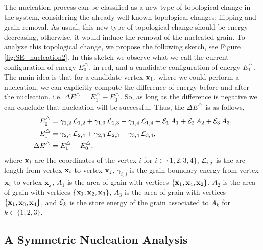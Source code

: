 The nucleation process can be classified as a new type of topological change in the system, considering the already well-known topological changes: flipping and  grain removal.
As usual, this new type of topological change should be energy decreasing, otherwise, it would 
induce the removal of the nucleated grain.
To analyze this topological change, we propose the following sketch, see Figure \ref{fig:SE_nucleation2}.
In this sketch we observe what we call
the current configuration of energy $E_0^{\triangle}$, in red, and a candidate configuration of energy $E_1^{\triangle}$.
The main idea is that for a candidate vertex $\x_1$, where we could perform a nucleation,
we can explicitly compute the difference of energy
before and after the nucleation, i.e. $\Delta E^{\triangle}=E_1^{\triangle}-E_0^{\triangle}$. 
So, as long as the difference is negative we can conclude that nucleation will be successful.
Thus, the $\Delta E^{\triangle}$ is as follows,
\begin{align}
    E_0^{\triangle} &= \gamma_{1,2}\,\mathcal{L}_{1,2}
    +\gamma_{1,3}\,\mathcal{L}_{1,3}+\gamma_{1,4}\,\mathcal{L}_{1,4}
    +\mathcal{E}_1\,A_1+\mathcal{E}_2\,A_2+\mathcal{E}_3\,A_3,\nonumber\\
    E_1^{\triangle} &= \gamma_{2,4}\,\mathcal{L}_{2,4}
    +\gamma_{2,3}\,\mathcal{L}_{2,3}+\gamma_{3,4}\,\mathcal{L}_{3,4},\nonumber\\
    \Delta E^{\triangle} &= E_1^{\triangle}-E_0^{\triangle},\label{eq:Delta_E_Nucleation}
\end{align}
where $\x_i$ are the coordinates of the vertex $i$ for $i\in\{1,2,3,4\}$, 
$\mathcal{L}_{i,j}$ is the arc-length from vertex $\x_i$ to vertex $\x_{j}$, $\gamma_{i,j}$ is the grain boundary energy from vertex $\x_i$ to vertex $\x_{j}$,  
$A_1$ is the area of grain with vertices $\{\x_1,\x_4,\x_2\}$,
$A_2$ is the area of grain with vertices $\{\x_1,\x_2,\x_3\}$,
$A_3$ is the area of grain with vertices $\{\x_1,\x_3,\x_4\}$,
and $\mathcal{E}_k$ is the store energy of the grain associated to $A_k$ for $k\in \{1,2,3\}$.

\subsection{A Symmetric Nucleation Analysis}

